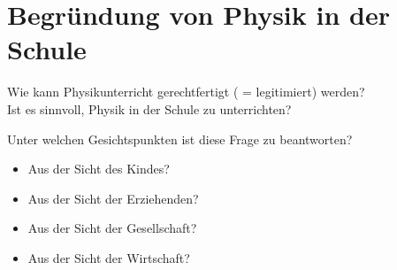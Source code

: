 \chapter{Begr\"{u}ndung von Physik in der Schule}\label{Begruendung}

Wie kann Physikunterricht gerechtfertigt ( = legitimiert) werden? \\
Ist es sinnvoll, Physik in der Schule zu unterrichten?

Unter welchen Gesichtspunkten ist diese Frage zu beantworten?
\begin{itemize}
	\item Aus der Sicht des Kindes?
	\item Aus der Sicht der Erziehenden?
	\item Aus der Sicht der Gesellschaft?
	\item Aus der Sicht der Wirtschaft?
\end{itemize}

